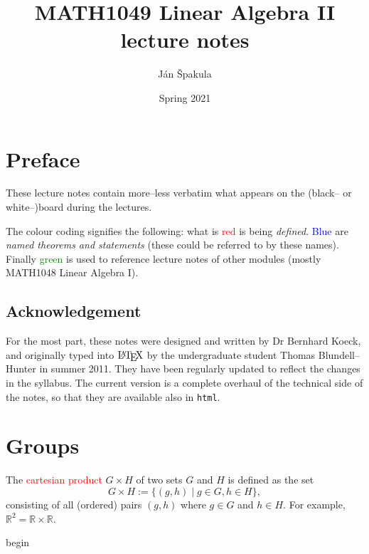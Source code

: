 \documentclass[
  12pt,
  a4paper,
  twoside]{article}
\title{MATH1049 Linear Algebra II lecture notes}
\author{Ján Špakula}
\date{Spring 2021}
\theoremstyle{plain}
\theoremstyle{definition}
\begin{document}
\maketitle

{
\setcounter{tocdepth}{2}
\tableofcontents
}
\hypertarget{preface}{%
\section*{Preface}\label{preface}}

These lecture notes contain more--less verbatim what appears on the (black-- or white--)board during the lectures.

The
colour coding
signifies the following: what is
\textcolor{red}{red}
is being \emph{defined}.
\textcolor{blue}{Blue}
are \emph{named theorems and statements} (these could be referred to by these names). Finally
\textcolor{green}{green}
is used to reference lecture notes of other modules (mostly MATH1048 Linear Algebra I).

\hypertarget{acknowledgement}{%
\subsection*{Acknowledgement}\label{acknowledgement}}

For the most part, these notes were designed and written by Dr Bernhard Koeck, and originally typed into \(\text{\LaTeX}\) by the undergraduate student Thomas Blundell--Hunter in summer 2011. They have been regularly updated to reflect the changes in the syllabus. The current version is a complete overhaul of the technical side of the notes, so that they are available also in \texttt{html}.

\newpage

\hypertarget{groups}{%
\section{Groups}\label{groups}}

The \textcolor{red}{cartesian product} \(G\times H\) of two sets \(G\) and \(H\) is defined as the set
\[ G\times H := \{(g,h) \mid g\in G, h\in H\}, \]
consisting of all (ordered) pairs \((g,h)\) where \(g\in G\) and \(h\in H\). For example, \(\mathbb{R}^2 = \mathbb{R}\times \mathbb{R}\).

\csname begin\label{cnj:defn-group}
\end{document}
